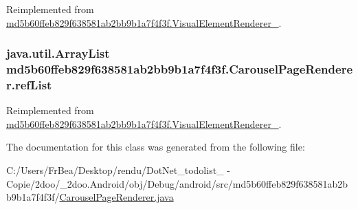 Reimplemented from \hyperlink{classmd5b60ffeb829f638581ab2bb9b1a7f4f3f_1_1_visual_element_renderer__1_4ef182bc984a4330ed789e1f0b0222d1}{md5b60ffeb829f638581ab2bb9b1a7f4f3f.VisualElementRenderer\_}.\hypertarget{classmd5b60ffeb829f638581ab2bb9b1a7f4f3f_1_1_carousel_page_renderer_01f3b95caffdb860759fbe4bafdefc03}{
\subsubsection[{refList}]{\setlength{\rightskip}{0pt plus 5cm}java.util.ArrayList {\bf md5b60ffeb829f638581ab2bb9b1a7f4f3f.CarouselPageRenderer.refList}}}
\label{classmd5b60ffeb829f638581ab2bb9b1a7f4f3f_1_1_carousel_page_renderer_01f3b95caffdb860759fbe4bafdefc03}




Reimplemented from \hyperlink{classmd5b60ffeb829f638581ab2bb9b1a7f4f3f_1_1_visual_element_renderer__1_4ebd0e42ebd360712eb189930036fc9f}{md5b60ffeb829f638581ab2bb9b1a7f4f3f.VisualElementRenderer\_}.

The documentation for this class was generated from the following file:\begin{CompactItemize}
\item 
C:/Users/FrBea/Desktop/rendu/DotNet\_\-todolist\_ - Copie/2doo/\_\-2doo.Android/obj/Debug/android/src/md5b60ffeb829f638581ab2bb9b1a7f4f3f/\hyperlink{md5b60ffeb829f638581ab2bb9b1a7f4f3f_2_carousel_page_renderer_8java}{CarouselPageRenderer.java}\end{CompactItemize}
